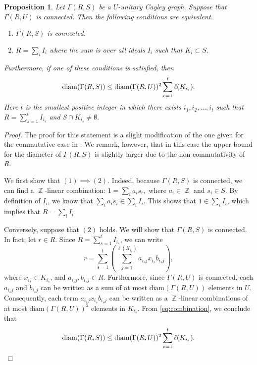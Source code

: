 \documentclass[12pt, a4paper]{amsart}
\newtheorem{prop}[thm]{Proposition}
\theoremstyle{definition}
\DeclareMathOperator{\Z}{\mathbb{Z}}
\numberwithin{equation}{section}
\begin{document}
\begin{prop} \label{prop:connectedness}
Let $\Gamma(R,S)$ be a $U$-unitary Cayley graph. Suppose that $\Gamma(R,U)$ is connected. Then the following conditions are equivalent. 
    \begin{enumerate}
        \item $\Gamma(R,S)$ is connected. 
        \item $R=\sum_{i} I_i$ where the sum is over all ideals $I_i$ such that $ K_i \subset S.$
    \end{enumerate}
    Furthermore, if one of these conditions is satisfied, then 
     \[ {\rm diam}(\Gamma(R,S)) \leq {\rm diam}(\Gamma(R,U))^2 \sum_{s=1}^t \ell(K_{i_s}) .\] 
    Here $t$ is the smallest positive integer in which there exists $i_1, i_2, \ldots, i_t$ such that $R=\sum_{s=1}^t I_{i_s}$ and $S \cap K_{i_s} \neq \emptyset.$
\end{prop}
\begin{proof}
    The proof for this statement is a slight modification of the one given for the commutative case in \cite[Proposition 3.10]{nguyen2025supercharacters}. We remark, however, that in this case the upper bound for the diameter of $\Gamma(R,S)$ is slightly larger due to the non-commutativity of $R.$


    We first show that $(1) \implies (2).$ Indeed, because $\Gamma(R,S)$ is connected, we can find a $\Z$-linear combination: $1 = \sum_{i} a_i s_i,$ 
    where $a_{i} \in \Z$ and $s_{i} \in S.$ By definition of $I_i$, we know that $\sum_{i} a_i s_i \in \sum_{i} I_i$. This shows that $1 \in \sum_{i} I_i$, which implies that $R=\sum_{i} I_i.$ 

    
    Conversely, suppose that $(2)$ holds. We will show that $\Gamma(R,S)$ is connected. In fact, let $r \in R.$ Since $R=\sum_{s=1}^t I_{i_s}$, we can write  
    \begin{equation} \label{eq:combination}
    r= \sum_{s=1}^t \left(\sum_{j=1}^{\ell(K_{i_s})} a_{i_s j} x_{i_s} b_{i_s j} \right),
    \end{equation}
     where $x_{i_s} \in K_{i_s}$, and  $a_{i_sj}, b_{i_s j} \in R.$ Furthermore, since $\Gamma(R,U)$ is connected, each $a_{i_s j}$ and $b_{i_s j}$ can be written as a sum of at most $\text{diam}(\Gamma(R,U))$ elements in $U$. Consequently, each term $a_{i_s j} x_{i_s} b_{i_s j}$ can be written as a $\Z$-linear combinations of at most $\text{diam}(\Gamma(R,U))^2$ elements in $K_{i_s}.$ From \cref{eq:combination}, we conclude that 
     \[ \text{diam}(\Gamma(R,S)) \leq \text{diam}(\Gamma(R,U))^2 \sum_{s=1}^t \ell(K_{i_s}).
     \qedhere \] 
\end{proof}
\end{document}
